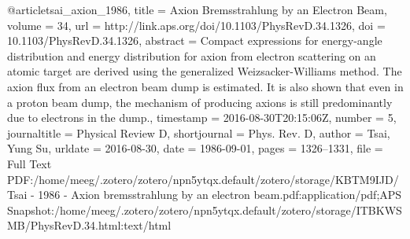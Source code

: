 @article{tsai_axion_1986,
  title = {Axion Bremsstrahlung by an Electron Beam},
  volume = {34},
  url = {http://link.aps.org/doi/10.1103/PhysRevD.34.1326},
  doi = {10.1103/PhysRevD.34.1326},
  abstract = {Compact expressions for energy-angle distribution and energy distribution for axion from electron scattering on an atomic target are derived using the generalized Weizsacker-Williams method. The axion flux from an electron beam dump is estimated. It is also shown that even in a proton beam dump, the mechanism of producing axions is still predominantly due to electrons in the dump.},
  timestamp = {2016-08-30T20:15:06Z},
  number = {5},
  journaltitle = {Physical Review D},
  shortjournal = {Phys. Rev. D},
  author = {Tsai, Yung Su},
  urldate = {2016-08-30},
  date = {1986-09-01},
  pages = {1326--1331},
  file = {Full Text PDF:/home/meeg/.zotero/zotero/npn5ytqx.default/zotero/storage/KBTM9IJD/Tsai - 1986 - Axion bremsstrahlung by an electron beam.pdf:application/pdf;APS Snapshot:/home/meeg/.zotero/zotero/npn5ytqx.default/zotero/storage/ITBKWSMB/PhysRevD.34.html:text/html}
}
